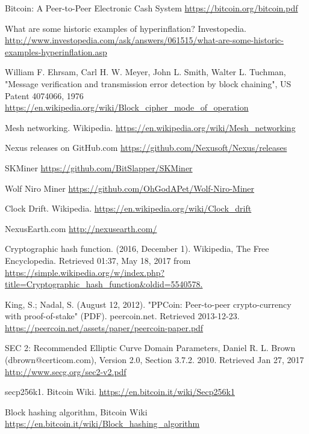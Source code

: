 \documentclass[11pt]{article}
\begin{document}
\pagebreak
\begin{thebibliography}{7}

Bitcoin: A Peer-to-Peer Electronic Cash System \url{https://bitcoin.org/bitcoin.pdf}

What are some historic examples of hyperinflation? Investopedia.
\url{http://www.investopedia.com/ask/answers/061515/what-are-some-historic-examples-hyperinflation.asp}

William F. Ehrsam, Carl H. W. Meyer, John L. Smith, Walter L. Tuchman, "Message verification and transmission error detection by block chaining", US Patent 4074066, 1976 \url{https://en.wikipedia.org/wiki/Block_cipher_mode_of_operation}

Mesh networking. Wikipedia.
\url{https://en.wikipedia.org/wiki/Mesh_networking}

Nexus releases on GitHub.com
\url{https://github.com/Nexusoft/Nexus/releases}

SKMiner
\url{https://github.com/BitSlapper/SKMiner}

Wolf Niro Miner
\url{https://github.com/OhGodAPet/Wolf-Niro-Miner}

Clock Drift. Wikipedia.
\url{https://en.wikipedia.org/wiki/Clock_drift}

NexusEarth.com
\url{http://nexusearth.com/}

Cryptographic hash function. (2016, December 1). Wikipedia, The Free Encyclopedia. Retrieved 01:37, May 18, 2017 from \url{https://simple.wikipedia.org/w/index.php?title=Cryptographic_hash_function&oldid=5540578.}

King, S.; Nadal, S. (August 12, 2012). "PPCoin: Peer-to-peer crypto-currency with proof-of-stake" (PDF). peercoin.net. Retrieved 2013-12-23. \url{https://peercoin.net/assets/paper/peercoin-paper.pdf}

SEC 2: Recommended Elliptic Curve Domain Parameters, Daniel R. L. Brown (dbrown@certicom.com), Version 2.0, Section 3.7.2. 2010. Retrieved Jan 27, 2017 \url{http://www.secg.org/sec2-v2.pdf}

secp256k1. Bitcoin Wiki.
\url{https://en.bitcoin.it/wiki/Secp256k1}
 
Block hashing algorithm, Bitcoin Wiki \url{https://en.bitcoin.it/wiki/Block_hashing_algorithm}


\end{thebibliography}
\end{document}
